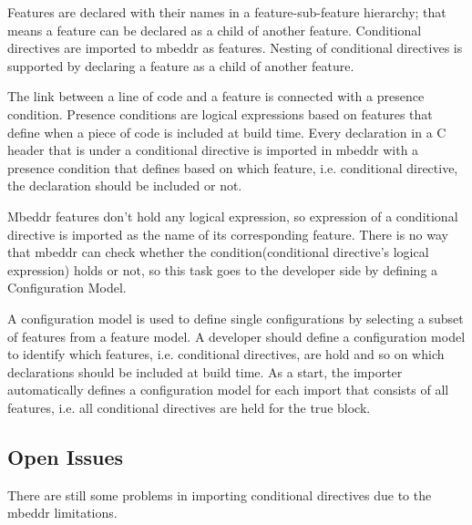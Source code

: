 \documentclass[titlepage]{article}
\begin{document}
Features are declared with their names in a feature-sub-feature hierarchy; that means a feature can be declared as a child of another feature. Conditional directives are imported to mbeddr as features. Nesting of conditional directives is supported by declaring a feature as a child of another feature. 

The link between a line of code and a feature is connected with a presence condition. Presence conditions are logical expressions based on features that define when a piece of code is included at build time. Every declaration in a C header that is under a conditional directive is imported in mbeddr with a presence condition that defines based on which feature, i.e. conditional directive, the declaration should be included or not.

Mbeddr features don't hold any logical expression, so expression of a conditional directive is imported as the name of its corresponding feature. There is no way that mbeddr can check whether the condition(conditional directive's logical expression) holds or not, so this task goes to the developer side by defining a Configuration Model.

A configuration model is used to define single configurations by selecting a subset of features from a feature model. A developer should define a configuration model to identify which features, i.e. conditional directives, are hold and so on which declarations should be included at build time. As a start, the importer automatically defines a configuration model for each import that consists of all features, i.e. all conditional directives are held for the true block.

\subsection{Open Issues}
There are still some problems in importing conditional directives due to the mbeddr limitations. 
\end{document}
